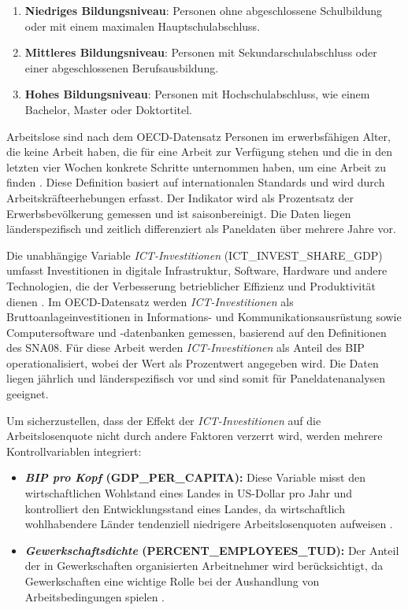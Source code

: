\begin{enumerate}
    \item \textbf{Niedriges Bildungsniveau}: Personen ohne 
    abgeschlossene Schulbildung oder mit einem maximalen Hauptschulabschluss.

    \item \textbf{Mittleres Bildungsniveau}: Personen mit 
    Sekundarschulabschluss oder einer abgeschlossenen Berufsausbildung.

    \item \textbf{Hohes Bildungsniveau}: Personen mit Hochschulabschluss, wie 
    einem Bachelor, Master oder Doktortitel.
\end{enumerate}

Arbeitslose sind nach dem \ac{OECD}-Datensatz Personen im erwerbsfähigen Alter, die keine 
Arbeit haben, die für eine Arbeit zur Verfügung stehen und die in den letzten vier Wochen 
konkrete Schritte unternommen haben, um eine Arbeit zu finden 
\parencite{oecd2022unemployment}. Diese Definition basiert auf internationalen Standards und 
wird durch Arbeitskräfteerhebungen erfasst. Der Indikator wird als Prozentsatz der 
Erwerbsbevölkerung gemessen und ist saisonbereinigt. Die Daten liegen länderspezifisch und 
zeitlich differenziert als Paneldaten über mehrere Jahre vor.

Die unabhängige Variable \textit{\ac{ICT}-Investitionen} (ICT\_INVEST\_SHARE\_GDP) umfasst 
Investitionen in digitale Infrastruktur, Software, Hardware und andere Technologien, die der 
Verbesserung betrieblicher Effizienz und Produktivität dienen \parencite{oecd2022ict}. Im 
\ac{OECD}-Datensatz werden \textit{\ac{ICT}-Investitionen} als Bruttoanlageinvestitionen in 
Informations- und Kommunikationsausrüstung sowie Computersoftware und -datenbanken gemessen, 
basierend auf den Definitionen des \ac{SNA08}. Für diese Arbeit werden 
\textit{\ac{ICT}-Investitionen} als Anteil des \ac{BIP} operationalisiert, wobei der Wert als 
Prozentwert angegeben wird. Die Daten liegen jährlich und länderspezifisch vor und sind somit 
für Paneldatenanalysen geeignet.

Um sicherzustellen, dass der Effekt der \textit{\ac{ICT}-Investitionen} auf die 
Arbeitslosenquote nicht durch andere Faktoren verzerrt wird, werden mehrere Kontrollvariablen 
integriert:

\begin{itemize}
    \item \textbf{\textit{\ac{BIP} pro Kopf} (GDP\_PER\_CAPITA):} Diese Variable misst den 
    wirtschaftlichen Wohlstand eines Landes in US-Dollar pro Jahr und kontrolliert den 
    Entwicklungsstand eines Landes, da wirtschaftlich wohlhabendere Länder tendenziell 
    niedrigere Arbeitslosenquoten aufweisen \parencite{oecd2022gdp}.

    \item \textbf{\textit{Gewerkschaftsdichte} (PERCENT\_EMPLOYEES\_TUD):} Der Anteil der in 
    Gewerkschaften organisierten Arbeitnehmer wird berücksichtigt, da Gewerkschaften eine 
    wichtige Rolle bei der Aushandlung von Arbeitsbedingungen spielen 
    \parencite{oecd2022tud}.
\end{itemize}

